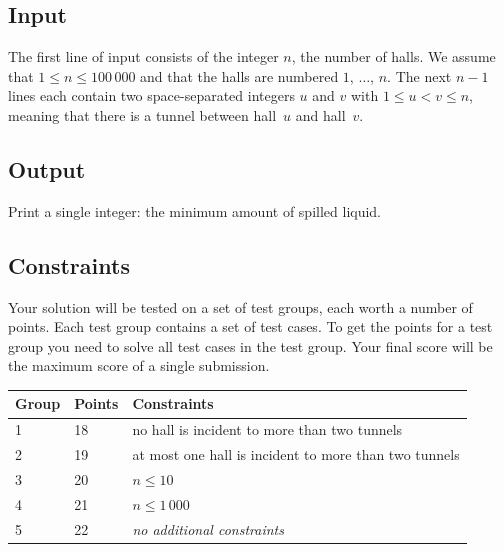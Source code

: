 \subsection*{Input}

The first line of input consists of the integer $n$, the number of halls.
We assume that $1\leq n\leq 100\,000$ and that the halls are numbered $1$, $\ldots$, $n$.
The next $n-1$ lines each contain two space-separated integers $u$ and $v$ with $1\leq u < v \leq n$, meaning that there is a tunnel between hall~$u$ and hall~$v$.

\subsection*{Output}

Print a single integer: the minimum amount of spilled liquid.

\subsection*{Constraints}

Your solution will be tested on a set of test groups, each worth a number of points.
Each test group contains a set of test cases.
To get the points for a test group you need to solve all test cases in the test group.
Your final score will be the maximum score of a single submission.

\medskip
\begin{tabular}{lll}
Group & Points & Constraints \\\hline
1 & 18 & no hall is incident to more than two tunnels\\
2 & 19 & at most one hall is incident to more than two tunnels\\
3 & 20 & $n\leq 10$\\
4 & 21 & $n\leq 1\,000$\\
5 & 22 & \emph{no additional constraints}
\end{tabular}
